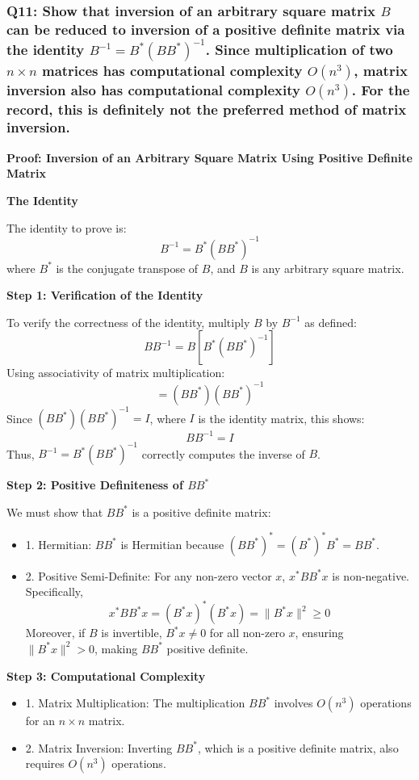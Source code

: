 \documentclass{article}
\begin{document}
\subsubsection*{Q11: Show that inversion of an arbitrary square matrix \(B\) can be reduced to inversion of a positive definite matrix via the identity \(B^{-1} = B^* (B B^*)^{-1}\). Since multiplication of two \(n \times n\) matrices has computational complexity \(O(n^3)\), matrix inversion also has computational complexity \(O(n^3)\). For the record, this is definitely not the preferred method of matrix inversion.}

\textbf{Proof: Inversion of an Arbitrary Square Matrix Using Positive Definite Matrix}

\textbf{The Identity}

The identity to prove is:
\[ B^{-1} = B^* (BB^*)^{-1} \]
where \( B^* \) is the conjugate transpose of \( B \), and \( B \) is any arbitrary square matrix.

\textbf{Step 1: Verification of the Identity}

To verify the correctness of the identity, multiply \( B \) by \( B^{-1} \) as defined:
\[ B B^{-1} = B [B^* (BB^*)^{-1}] \]
Using associativity of matrix multiplication:
\[ = (BB^*)(BB^*)^{-1} \]
Since \( (BB^*) (BB^*)^{-1} = I \), where \( I \) is the identity matrix, this shows:
\[ B B^{-1} = I \]
Thus, \( B^{-1} = B^* (BB^*)^{-1} \) correctly computes the inverse of \( B \).

\textbf{Step 2: Positive Definiteness of \( BB^* \)}

We must show that \( BB^* \) is a positive definite matrix:
\begin{itemize}
    \item 1. Hermitian: \( BB^* \) is Hermitian because \( (BB^*)^* = (B^*)^*B^* = BB^* \).
    \item 2. Positive Semi-Definite: For any non-zero vector \( x \), \( x^*BB^*x \) is non-negative. Specifically,
     \[ x^*BB^*x = (B^*x)^*(B^*x) = \|B^*x\|^2 \geq 0 \]
     Moreover, if \( B \) is invertible, \( B^*x \neq 0 \) for all non-zero \( x \), ensuring \( \|B^*x\|^2 > 0 \), making \( BB^* \) positive definite.
\end{itemize}

\textbf{Step 3: Computational Complexity}

\begin{itemize}
    \item 1. Matrix Multiplication: The multiplication \( BB^* \) involves \( O(n^3) \) operations for an \( n \times n \) matrix.
    \item 2. Matrix Inversion: Inverting \( BB^* \), which is a positive definite matrix, also requires \( O(n^3) \) operations.
\end{itemize}
\end{document}

